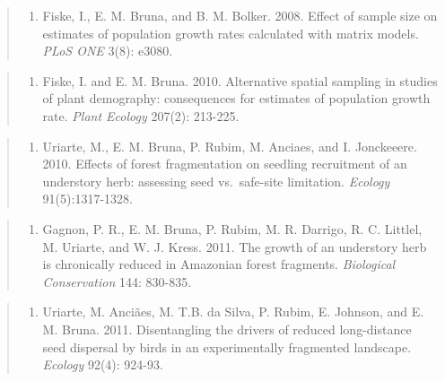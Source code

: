 \documentclass[
  12pt,
  man, donotrepeattitle,floatsintext]{apa6}
\providecommand{\tightlist}{%
  \setlength{\itemsep}{0pt}\setlength{\parskip}{0pt}}
\begin{document}
\begin{quote}
\begin{enumerate}
\def\labelenumi{\arabic{enumi}.}
\setcounter{enumi}{8}
\tightlist
\item
  Fiske, I., E. M. Bruna, and B. M. Bolker. 2008. Effect of sample size on estimates of population growth rates calculated with matrix models. \emph{PLoS ONE} 3(8): e3080.
\end{enumerate}
\end{quote}

\begin{quote}
\begin{enumerate}
\def\labelenumi{\arabic{enumi}.}
\setcounter{enumi}{9}
\tightlist
\item
  Fiske, I. and E. M. Bruna. 2010. Alternative spatial sampling in studies of plant demography: consequences for estimates of population growth rate. \emph{Plant Ecology} 207(2): 213-225.
\end{enumerate}
\end{quote}

\begin{quote}
\begin{enumerate}
\def\labelenumi{\arabic{enumi}.}
\setcounter{enumi}{10}
\tightlist
\item
  Uriarte, M., E. M. Bruna, P. Rubim, M. Anciaes, and I. Jonckeeere. 2010. Effects of forest fragmentation on seedling recruitment of an understory herb: assessing seed vs.~safe-site limitation. \emph{Ecology} 91(5):1317-1328.
\end{enumerate}
\end{quote}

\begin{quote}
\begin{enumerate}
\def\labelenumi{\arabic{enumi}.}
\setcounter{enumi}{11}
\tightlist
\item
  Gagnon, P. R., E. M. Bruna, P. Rubim, M. R. Darrigo, R. C. Littlel, M. Uriarte, and W. J. Kress. 2011. The growth of an understory herb is chronically reduced in Amazonian forest fragments. \emph{Biological Conservation} 144: 830-835.
\end{enumerate}
\end{quote}

\begin{quote}
\begin{enumerate}
\def\labelenumi{\arabic{enumi}.}
\setcounter{enumi}{12}
\tightlist
\item
  Uriarte, M. Anciães, M. T.B. da Silva, P. Rubim, E. Johnson, and E. M. Bruna. 2011. Disentangling the drivers of reduced long-distance seed dispersal by birds in an experimentally fragmented landscape. \emph{Ecology} 92(4): 924-93.
\end{enumerate}
\end{quote}
\end{document}
